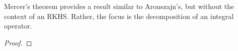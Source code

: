 \def\dd{\;\mathrm{d}}
\def\dx{\dd{x}}
\def\dy{\dd{y}}
\def\dt{\dd{t}}
Mercer's theorem provides a result similar to Aronszajn's, but without the context of an RKHS.
Rather, the focus is the decomposition of an integral operator.

\begin{theorem}
    \label{thm:mercers}
    \cite{mercer1909xvi}
    
\end{theorem}
\begin{proof}
    
\end{proof}

